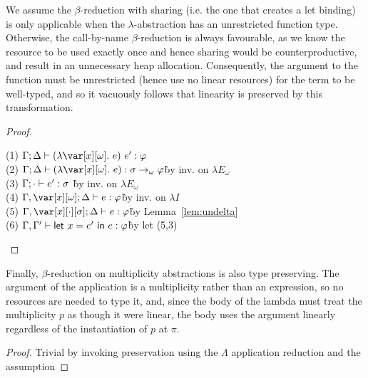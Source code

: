 \noindent We assume the $\beta$-reduction with sharing (i.e. the one that creates a let
binding) is only applicable when the $\lambda$-abstraction has an unrestricted
function type. Otherwise, the call-by-name $\beta$-reduction is always
favourable, as we know the resource to be used exactly once and hence sharing
would be counterproductive, and result in an unnecessary heap allocation.
%
Consequently, the argument to the function must be unrestricted (hence use no
linear resources) for the term to be well-typed, and so it vacuously follows
that linearity is preserved by this transformation.

\BetaReductionSharingTheorem

\begin{proof}~

\begin{tabbing}
    (1) $\G;\D \vdash (\lambda \xo.~e)~e' : \vp$\\
    (2) $\G; \D \vdash (\lambda \xo.~e) : \s \to_\omega \vp$\` by inv. on $\lambda E_\omega$\\
    (3) $\Gamma; \cdot \vdash e' : \sigma$ \` by inv. on $\lambda E_\omega$\\
    (4) $\G,\xo; \D \vdash e : \vp$\` by inv. on $\lambda I$\\
    (5) $\G, \x[\cdot][\s]; \D \vdash e : \vp$\` by Lemma~\ref{lem:undelta}\\
    (6) $\Gamma,\Gamma' \vdash \mathsf{let}~x = e'~\mathsf{in}~e : \varphi$\` by let (5,3)\\
\end{tabbing}
\end{proof}

\noindent Finally, $\beta$-reduction on multiplicity abstractions is also type
preserving. The argument of the application is a multiplicity rather than an
expression, so no resources are needed to type it, and, since the body of the
lambda must treat the multiplicity $p$ as though it were linear, the body uses
the argument linearly regardless of the instantiation of $p$ at $\pi$.

\BetaReductionMultTheorem

\begin{proof}
    Trivial by invoking preservation using the $\Lambda$ application reduction and the assumption
\end{proof}


